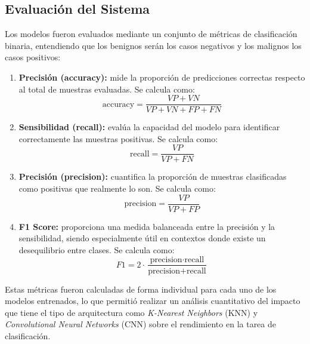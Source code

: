 \documentclass[12pt]{article} %
\begin{document}
\subsection{Evaluación del Sistema}
Los modelos fueron evaluados mediante un conjunto de métricas de clasificación binaria, entendiendo que los benignos serán los casos negativos y los malignos los casos positivos:

\begin{enumerate}
    \item \textbf{Precisión (accuracy):} mide la proporción de predicciones correctas respecto al total de muestras evaluadas. Se calcula como:
    \begin{equation}
        \text{accuracy} = \frac{VP + VN}{VP + VN + FP + FN}
    \end{equation}
    
    \item \textbf{Sensibilidad (recall):} evalúa la capacidad del modelo para identificar correctamente las muestras positivas. Se calcula como:
    \begin{equation}
        \text{recall} = \frac{VP}{VP + FN}
    \end{equation}
    
    \item \textbf{Precisión (precision):} cuantifica la proporción de muestras clasificadas como positivas que realmente lo son. Se calcula como:
    \begin{equation}
        \text{precision} = \frac{VP}{VP + FP}
    \end{equation}
    
    \item \textbf{F1 Score:} proporciona una medida balanceada entre la precisión y la sensibilidad, siendo especialmente útil en contextos donde existe un desequilibrio entre clases. Se calcula como:
    \begin{equation}
        F1 = 2 \cdot \frac{\text{precision} \cdot \text{recall}}{\text{precision} + \text{recall}}
    \end{equation}
\end{enumerate}



Estas métricas fueron calculadas de forma individual para cada uno de los modelos entrenados, lo que permitió realizar un análisis cuantitativo del impacto que tiene el tipo de arquitectura como \textit{K-Nearest Neighbors} (KNN) y \textit{Convolutional Neural Networks} (CNN) sobre el rendimiento en la tarea de clasificación. \\
\end{document}
